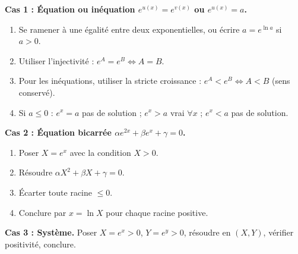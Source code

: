 \documentclass[11pt]{article}
\newcommand{\cle}[1]{{\popxbold\color{popdark}#1}}
\begin{document}
\begin{methode}
\textbf{Cas 1 : Équation ou inéquation $e^{u(x)}=e^{v(x)}$ ou $e^{u(x)}=a$.}
\begin{enumerate}
\item Se ramener à une égalité entre \cle{deux exponentielles}, ou écrire $a=e^{\ln a}$ si $a>0$.
\item Utiliser l'\cle{injectivité} : $e^{A}=e^{B}\Leftrightarrow A=B$.
\item Pour les inéquations, utiliser la \cle{stricte croissance} : $e^{A}<e^{B}\Leftrightarrow A<B$ (sens conservé).
\item Si $a\leq 0$ : $e^{x}=a$ pas de solution ; $e^{x}>a$ vrai $\forall x$ ; $e^{x}<a$ pas de solution.
\end{enumerate}

\textbf{Cas 2 : Équation bicarrée $\alpha e^{2x}+\beta e^{x}+\gamma=0$.}
\begin{enumerate}
\item Poser $X=e^{x}$ avec la condition \cle{$X>0$}.
\item Résoudre $\alpha X^{2}+\beta X+\gamma=0$.
\item \cle{Écarter} toute racine $\leq 0$.
\item Conclure par $x=\ln X$ pour chaque racine positive.
\end{enumerate}

\textbf{Cas 3 : Système.} Poser $X=e^{x}>0$, $Y=e^{y}>0$, résoudre en $(X,Y)$, vérifier positivité, conclure.
\end{methode}
\end{document}
